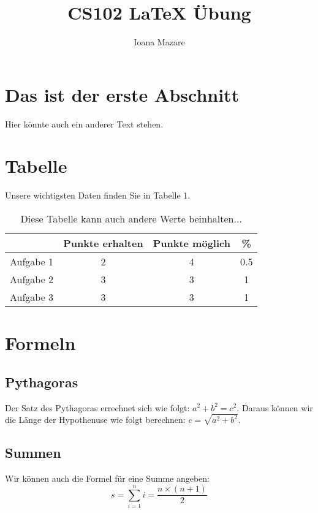 \documentclass[11pt,a4paper]{article}
\begin{document}
\title{CS102 \LaTeX \hspace{1pt} \"Ubung}
\author{Ioana Mazare}
\maketitle

\section{Das ist der erste Abschnitt}
Hier k\"onnte auch ein anderer Text stehen.

\section{Tabelle}
Unsere wichtigsten Daten finden Sie in Tabelle 1.
\begin{table}[h]
\centering
\begin{tabular}{c|c|c|c}
 & Punkte erhalten & Punkte m\"oglich & \% \\
\hline
Aufgabe 1 & 2 & 4 & 0.5 \\
Aufgabe 2 & 3 & 3 & 1 \\
Aufgabe 3 & 3 & 3 & 1 \\
\end{tabular}
\caption{Diese Tabelle kann auch andere Werte beinhalten...}
\end{table}

\section{Formeln}
\subsection{Pythagoras}
Der Satz des Pythagoras errechnet sich wie folgt: $a^{2}+b^{2}=c^{2}$.
Daraus k\"onnen wir die L\"ange der Hypothenuse wie folgt berechnen: $c=\sqrt{a^{2}+b^{2}}$.

\subsection{Summen}
Wir k\"onnen auch die Formel f\"ur eine Summe angeben:
\begin{equation}
s=\sum_{i=1}^{n} i=\frac{n\times(n+1)}{2}
\end{equation}
\end{document}
